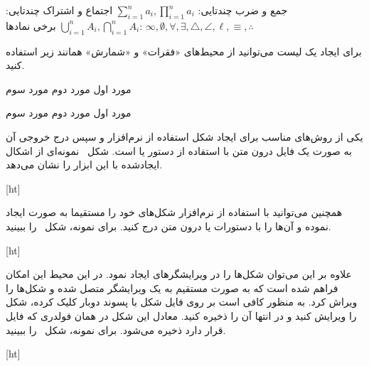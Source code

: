  جمع و ضرب چندتایی:
$\sum_{i=1}^{n} a_i, \prod_{i=1}^{n} a_i$
 اجتماع و اشتراک چندتایی:
$\bigcup_{i=1}^{n} A_i, \bigcap_{i=1}^{n} A_i$
 برخی نمادها:
$\infty, \emptyset, \forall, \exists, \triangle, \angle, \ell, \equiv, \therefore$



برای ایجاد یک لیست‌ می‌توانید از محیط‌های «فقرات» و «شمارش» همانند زیر استفاده کنید.

\begin{multicols}{2}
 مورد اول
 مورد دوم
 مورد سوم

 مورد اول
 مورد دوم
 مورد سوم

\end{multicols}



یکی از روش‌های مناسب برای ایجاد شکل استفاده از نرم‌افزار  و سپس
درج خروجی آن به صورت یک فایل  درون متن 
با استفاده از دستور   یا  است.
شکل~ نمونه‌ای از اشکال ایجادشده با این ابزار را نشان می‌دهد.


[ht]

\bigskip
همچنین می‌توانید با استفاده از نرم‌افزار  شکل‌های خود را مستقیما
به صورت  ایجاد نموده و آن‌ها را با دستورات  یا   
درون متن درج کنید. برای نمونه، شکل~ را ببینید.


[ht]


\bigskip
علاوه بر این می‌توان شکل‌ها را در ویرایشگرهای   ایجاد نمود. در این محیط این امکان فراهم شده است که به صورت مستقیم به یک ویرایشگر  متصل شده و شکل‌ها را ویراش کرد. به منظور کافی است بر روی فایل شکل با پسوند  دوبار کلیک کرده، شکل را ویرایش کنید و در انتها آن را ذخیره کنید. معادل  این شکل در همان فولدری که فایل  قرار دارد ذخیره می‌شود.
 برای نمونه، شکل~ را ببینید.
 
[ht]



